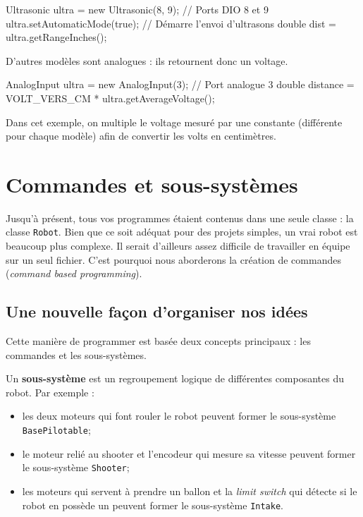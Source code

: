 \documentclass[12pt]{report}
\begin{document}
\begin{code}
Ultrasonic ultra = new Ultrasonic(8, 9); // Ports DIO 8 et 9
ultra.setAutomaticMode(true); // Démarre l'envoi d'ultrasons
double dist = ultra.getRangeInches();
\end{code}

D'autres modèles sont analogues : ils retournent donc un voltage.

\begin{code}
AnalogInput ultra = new AnalogInput(3); // Port analogue 3
double distance = VOLT_VERS_CM * ultra.getAverageVoltage();
\end{code}

Dans cet exemple, on multiple le voltage mesuré par une constante (différente pour chaque modèle) afin de convertir les volts en centimètres.


\chapter{Commandes et sous-systèmes}

Jusqu'à présent, tous vos programmes étaient contenus dans une seule classe : la classe \texttt{Robot}. Bien que ce soit adéquat pour des projets simples, un vrai robot est beaucoup plus complexe. Il serait d'ailleurs assez difficile de travailler en équipe sur un seul fichier. C'est pourquoi nous aborderons la création de commandes (\textit{command based programming}).

\section{Une nouvelle façon d'organiser nos idées}

Cette manière de programmer est basée deux concepts principaux : les commandes et les sous-systèmes. 

Un \textbf{sous-système} est un regroupement logique de différentes composantes du robot. Par exemple :

\begin{itemize}
	\item les deux moteurs qui font rouler le robot peuvent former le sous-système \texttt{BasePilotable};
	\item le moteur relié au shooter et l'encodeur qui mesure sa vitesse peuvent former le sous-système \texttt{Shooter};
	\item les moteurs qui servent à prendre un ballon et la \textit{limit switch} qui détecte si le robot en possède un peuvent former le sous-système \texttt{Intake}.
\end{itemize}
\end{document}
